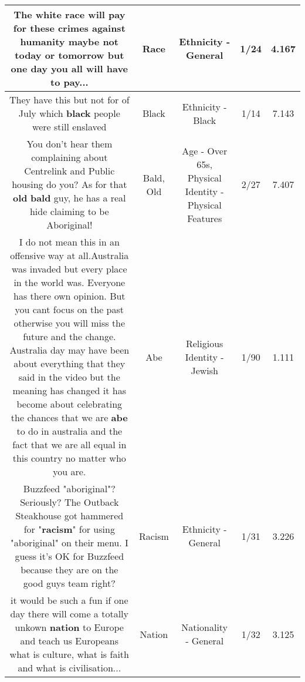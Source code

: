 \documentclass[11pt]{article}
\newlength\mylength
\begin{document}
\begin{center}
\begin{longtable}{|C{.65\mylength}|C{.30\mylength}|C{.12\mylength}|C{.12\mylength}|C{.12\mylength}|}
  \small The white \textbf{race} will pay for these crimes against humanity maybe not today or tomorrow but one day you all will have to pay...\normalsize   & Race & Ethnicity - General & 1/24 & 4.167 \\  \hline
  \small They have this but not for of July which \textbf{black} people were still enslaved\normalsize   & Black & Ethnicity - Black & 1/14 & 7.143 \\  \hline
  \small You don't hear them complaining about Centrelink and Public housing do you? As for that \textbf{old} \textbf{bald} guy, he has a real hide claiming to be Aboriginal!\normalsize   & Bald, Old & Age - Over 65s, Physical Identity - Physical Features & 2/27 & 7.407 \\  \hline
  \small I do not mean this in an offensive way at all.Australia was invaded but every place in the world was. Everyone has there own opinion. But you cant focus on the past otherwise you will miss the future and the change. Australia day may have been about everything that they said in the video but the meaning has changed it has become about celebrating the chances that we are \textbf{abe} to do in australia and the fact that we are all equal in this country no matter who you are.\normalsize   & Abe & Religious Identity - Jewish & 1/90 & 1.111 \\  \hline
  \small Buzzfeed "aboriginal"? Seriously? The Outback Steakhouse got hammered for "\textbf{racism}" for using "aboriginal" on their menu. I guess it's OK for Buzzfeed because they are on the good guys team right?\normalsize   & Racism & Ethnicity - General & 1/31 & 3.226 \\  \hline
  \small it would be such a fun if one day there will come a totally unkown \textbf{nation} to Europe and teach us Europeans what is culture, what is faith and what is civilisation...\normalsize   & Nation & Nationality - General & 1/32 & 3.125 \\  \hline

\end{longtable}
\end{center}
\end{document}

